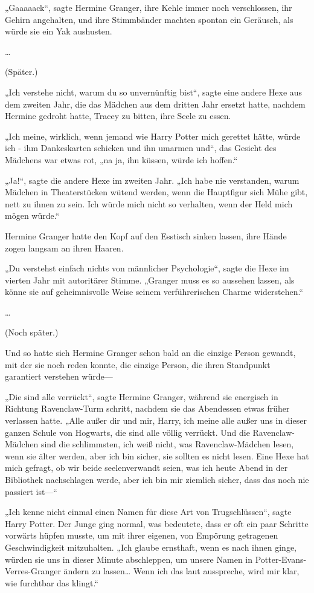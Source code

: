 {„Gaaaaack“, sagte Hermine Granger, ihre Kehle immer noch verschlossen, ihr Gehirn angehalten, und ihre Stimmbänder machten spontan ein Geräusch, als würde sie ein Yak aushusten.

…

(Später.)

„Ich verstehe nicht, warum du so unvernünftig bist“, sagte eine andere Hexe aus dem zweiten Jahr, die das Mädchen aus dem dritten Jahr ersetzt hatte, nachdem Hermine gedroht hatte, Tracey zu bitten, ihre Seele zu essen.

„Ich meine, wirklich, wenn jemand wie Harry Potter mich gerettet hätte, würde ich - ihm Dankeskarten schicken und ihn umarmen und“, das Gesicht des Mädchens war etwas rot, „na ja, ihn küssen, würde ich hoffen.“

„Ja!“, sagte die andere Hexe im zweiten Jahr. „Ich habe nie verstanden, warum Mädchen in Theaterstücken wütend werden, wenn die Hauptfigur sich Mühe gibt, nett zu ihnen zu sein. Ich würde mich nicht so verhalten, wenn der Held mich mögen würde.“

Hermine Granger hatte den Kopf auf den Esstisch sinken lassen, ihre Hände zogen langsam an ihren Haaren.

„Du verstehst einfach nichts von männlicher Psychologie“, sagte die Hexe im vierten Jahr mit autoritärer Stimme. „Granger muss es so aussehen lassen, als könne sie auf geheimnisvolle Weise seinem verführerischen Charme widerstehen.“

…

(Noch später.)

Und so hatte sich Hermine Granger schon bald an die einzige Person gewandt, mit der sie noch reden konnte, die einzige Person, die ihren Standpunkt garantiert verstehen würde—

„Die sind alle verrückt“, sagte Hermine Granger, während sie energisch in Richtung Ravenclaw-Turm schritt, nachdem sie das Abendessen etwas früher verlassen hatte. „Alle außer dir und mir, Harry, ich meine alle außer uns in dieser ganzen Schule von Hogwarts, die sind alle völlig verrückt. Und die Ravenclaw-Mädchen sind die schlimmsten, ich weiß nicht, was Ravenclaw-Mädchen lesen, wenn sie älter werden, aber ich bin sicher, sie sollten es nicht lesen. Eine Hexe hat mich gefragt, ob wir beide seelenverwandt seien, was ich heute Abend in der Bibliothek nachschlagen werde, aber ich bin mir ziemlich sicher, dass das noch nie passiert ist—“

„Ich kenne nicht einmal einen Namen für diese Art von Trugschlüssen“, sagte Harry Potter. Der Junge ging normal, was bedeutete, dass er oft ein paar Schritte vorwärts hüpfen musste, um mit ihrer eigenen, von Empörung getragenen Geschwindigkeit mitzuhalten. „Ich glaube ernsthaft, wenn es nach ihnen ginge, würden sie uns in dieser Minute abschleppen, um unsere Namen in Potter-Evans-Verres-Granger ändern zu lassen… Wenn ich das laut ausspreche, wird mir klar, wie furchtbar das klingt.“

}
